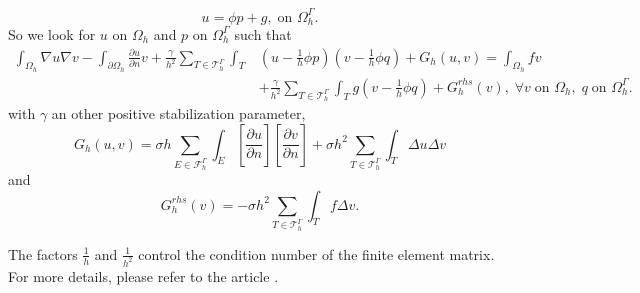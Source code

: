 \begin{enumerate}[label=\textbullet]
	\begin{equation*}
		u=\phi p+g, \; \text{on } \Omega_h^\Gamma.
	\end{equation*}
	So we look for $u$ on $\Omega_h$ and $p$ on $\Omega_h^\Gamma$ such that
	\begin{align*}
		\int_{\Omega_h}\nabla u\nabla v-\int_{\partial\Omega_h}\frac{\partial u}{\partial n} v + \frac{\gamma}{h^2} \sum_{T\in\mathcal{T}_h^\Gamma}\int_T &\left(u-\frac{1}{h}\phi p\right)\left(v-\frac{1}{h}\phi q\right) + G_h(u,v) = \int_{\Omega_h}fv \\
		&+ \frac{\gamma}{h^2} \sum_{T\in\mathcal{T}_h^\Gamma}\int_T g\left(v-\frac{1}{h}\phi q\right) + G_h^{rhs}(v), \; \forall v \; \text{on } \Omega_h, \; q \; \text{on } \Omega_h^\Gamma.
	\end{align*}
	with $\gamma$ an other positive stabilization parameter,
	\begin{equation*}
		G_h(u,v)=\sigma h\sum_{E\in\mathcal{F}_h^\Gamma}\int_E\left[\frac{\partial u}{\partial n}\right]\left[\frac{\partial v}{\partial n}\right]+\sigma h^2\sum_{T\in\mathcal{T}_h^\Gamma}\int_T \Delta u\Delta v
	\end{equation*}
	and
	\begin{equation*}
		G_h^{rhs}(v)=-\sigma h^2\sum_{T\in\mathcal{T}_h^\Gamma}\int_T f\Delta v.
	\end{equation*}
	\begin{Rem}
		The factors $\frac{1}{h}$ and $\frac{1}{h^2}$ control the condition number of the finite element matrix. For more details, please refer to the article \cite{duprez_new_2023}.
	\end{Rem}
\end{enumerate}